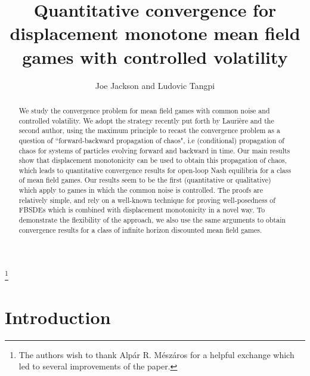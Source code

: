 \documentclass[11pt,reqno]{amsart}
\title[Convergence for mean field games with controlled volatility]{Quantitative convergence for displacement monotone mean field games with controlled volatility}
\author{Joe Jackson and Ludovic Tangpi}
\numberwithin{equation}{section}
\theoremstyle{definition}
\newcommand\blfootnote[1]{%
  \begingroup
  \renewcommand\thefootnote{}\footnote{#1}%
  \addtocounter{footnote}{-1}%
  \endgroup
}
\begin{document}
\blfootnote{The authors wish to thank Alp\'ar R. M\'esz\'aros for a helpful exchange which led to several improvements of the paper.}

\begin{abstract}
We study the convergence problem for mean field games with common noise and controlled volatility. We adopt the strategy recently put forth by Lauri\`ere and the second author, using the maximum principle to recast the convergence problem as a question of ``forward-backward propagation of chaos", i.e (conditional) propagation of chaos for systems of particles evolving forward and backward in time. Our main results show that displacement monotonicity can be used to obtain this propagation of chaos, which leads to quantitative convergence results for open-loop Nash equilibria for a class of mean field games. Our results seem to be the first (quantitative or qualitative) which apply to games in which the common noise is controlled. The proofs are relatively simple, and rely on a well-known technique for proving well-posedness of FBSDEs which is combined with displacement monotonicity in a novel way. To demonstrate the flexibility of the approach, we also use the same arguments to obtain convergence results for a class of infinite horizon discounted mean field games.
\end{abstract}


\maketitle


\tableofcontents


\section{Introduction}
\end{document}

